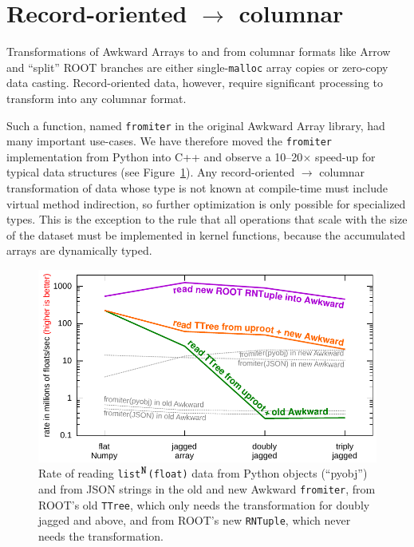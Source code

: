 \documentclass{webofc}
\begin{document}
\section{Record-oriented $\to$ columnar}
\label{lab:fillablearray}

Transformations of Awkward Arrays to and from columnar formats like Arrow and ``split'' ROOT branches are either single-\texttt{malloc} array copies or zero-copy data casting. Record-oriented data, however, require significant processing to transform into any columnar format.

Such a function, named \texttt{fromiter} in the original Awkward Array library, had many important use-cases. We have therefore moved the \texttt{fromiter} implementation from Python into C++ and observe a 10--20$\times$ speed-up for typical data structures (see Figure~\ref{fig:read_ttree}). Any record-oriented $\to$ columnar transformation of data whose type is not known at compile-time must include virtual method indirection, so further optimization is only possible for specialized types. This is the exception to the rule that all operations that scale with the size of the dataset must be implemented in kernel functions, because the accumulated arrays are dynamically typed.

\begin{figure}
\begin{center}
\includegraphics[width=0.75\linewidth]{read_ttree.pdf}
\end{center}

\vspace{-0.25 cm}
\caption{Rate of reading {\tt list}$^{\mbox{\tt N}}${\tt (float)} data from Python objects (``pyobj'') and from JSON strings in the old and new Awkward \texttt{fromiter}, from ROOT's old \texttt{TTree}, which only needs the transformation for doubly jagged and above, and from ROOT's new \texttt{RNTuple}, which never needs the transformation. \label{fig:read_ttree}}
\end{figure}
\end{document}
